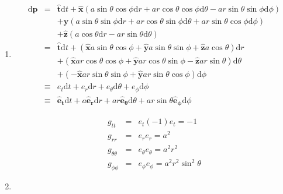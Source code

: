 \documentclass[12pt,a4paper]{article}
\begin{document}
\begin{enumerate}
\item

\begin{eqnarray*}
	\mathrm d\bm p &=&  \bm{\hat t}\mathrm dt + \bm{\hat x} ( a \sin\theta \cos\phi \mathrm d r  +  a r \cos\theta \cos\phi \mathrm d \theta - a r \sin\theta \sin\phi\mathrm d\phi ) \\
	&& + \bm{\hat y} ( a\sin\theta\sin\phi \mathrm dr + a r\cos\theta \sin\phi \mathrm d \theta + a r \sin\theta \cos\phi \mathrm d\phi  )  \\
	&& + \bm{\hat z} ( a \cos\theta \mathrm d r - a r \sin\theta \mathrm d \theta )  \\
	&=& \bm{\hat t}\mathrm dt + ( \bm{\hat x}a \sin\theta \cos\phi + \bm{\hat y}a \sin\theta \sin\phi + \bm{\hat z}  a\cos\theta)\mathrm dr \\
	&& + ( \bm{\hat x} a r \cos\theta \cos\phi + \bm{\hat y} a r\cos\theta\sin\phi - \bm{\hat z}  a r\sin\theta )\mathrm d\theta  \\
	&& + ( -\bm{\hat x} a r \sin\theta\sin\phi + \bm{\hat y}a r \sin\theta\cos\phi )\mathrm d\phi \\
	&\equiv& e_t \mathrm dt + e_r \mathrm dr + e_\theta \mathrm d \theta + e_\phi \mathrm d\phi \\
	&\equiv& \bm{\hat e_t}\mathrm d t + a \bm{\hat e_r}\mathrm d r + a r \bm{\hat e_\theta} \mathrm d \theta + a r\sin\theta\bm{\hat e_\phi} \mathrm d \phi
\end{eqnarray*}



\begin{eqnarray*}
	g_{tt}&=& e_t (-1) e_t = -1 \\
	g_{rr}&=& e_r e_r = a^2 \\
	g_{\theta\theta} &=& e_\theta e_\theta = a^2 r^2 \\
	g_{\phi\phi} &=& e_\phi e_\phi = a^2 r^2 \sin^2\theta
\end{eqnarray*}




\item


\end{enumerate}
\end{document}
